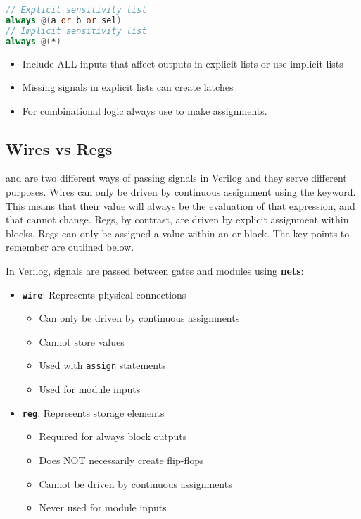 \documentclass[12pt]{labmanual}
\begin{document}
\begin{lstlisting}[language=verilog]
// Explicit sensitivity list
always @(a or b or sel) 
// Implicit sensitivity list
always @(*)
\end{lstlisting}

\begin{important}
\begin{itemize}
    \item Include ALL inputs that affect outputs in explicit lists or use implicit lists
    \item Missing signals in explicit lists can create latches
    \item For combinational logic always use \code{=} to make assignments.
\end{itemize}
\end{important}

\subsection{Wires vs Regs}
 and  are two different ways of passing signals in Verilog and they serve different purposes. Wires can only be driven by continuous assignment using the  keyword. This means that their value will always be the evaluation of that expression, and that cannot change. Regs, by contrast, are driven by explicit assignment within  blocks. Regs can only be assigned a value within an  or  block. The key points to remember are outlined below.

\begin{important}
In Verilog, signals are passed between gates and modules using \textbf{nets}:
\begin{itemize}
    \item \textbf{\texttt{wire}}: Represents physical connections
    \begin{itemize}
        \item Can only be driven by continuous assignments
        \item Cannot store values
        \item Used with \texttt{assign} statements
        \item Used for module inputs
    \end{itemize}
    \item \textbf{\texttt{reg}}: Represents storage elements
    \begin{itemize}
        \item Required for always block outputs
        \item Does NOT necessarily create flip-flops
        \item Cannot be driven by continuous assignments
        \item Never used for module inputs
    \end{itemize}
\end{itemize}
\end{important}
\end{document}
